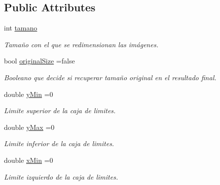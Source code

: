 \subsection*{Public Attributes}
\begin{DoxyCompactItemize}
\item 
\mbox{\label{classuav_1_1Stitcher_aecfe8592eb3d8445c0f3e8b722558acb}} 
int \mbox{\hyperlink{classuav_1_1Stitcher_aecfe8592eb3d8445c0f3e8b722558acb}{tamano}}
\begin{DoxyCompactList}\small\item\em Tamaño con el que se redimensionan las imágenes. \end{DoxyCompactList}\item 
\mbox{\label{classuav_1_1Stitcher_a222f8247abb4fafba61d86078d8f9c16}} 
bool \mbox{\hyperlink{classuav_1_1Stitcher_a222f8247abb4fafba61d86078d8f9c16}{original\+Size}} =false
\begin{DoxyCompactList}\small\item\em Booleano que decide si recuperar tamaño original en el resultado final. \end{DoxyCompactList}\item 
\mbox{\label{classuav_1_1Stitcher_a4b793c80fbb1052781b3787e90d19f97}} 
double \mbox{\hyperlink{classuav_1_1Stitcher_a4b793c80fbb1052781b3787e90d19f97}{y\+Min}} =0
\begin{DoxyCompactList}\small\item\em Limite superior de la caja de limites. \end{DoxyCompactList}\item 
\mbox{\label{classuav_1_1Stitcher_ae5ef4cb4ade964a9ff73c8228db26f6a}} 
double \mbox{\hyperlink{classuav_1_1Stitcher_ae5ef4cb4ade964a9ff73c8228db26f6a}{y\+Max}} =0
\begin{DoxyCompactList}\small\item\em Limite inferior de la caja de limites. \end{DoxyCompactList}\item 
\mbox{\label{classuav_1_1Stitcher_a26ca9f2ae4842f0d380f95d792c0c7ba}} 
double \mbox{\hyperlink{classuav_1_1Stitcher_a26ca9f2ae4842f0d380f95d792c0c7ba}{x\+Min}} =0
\begin{DoxyCompactList}\small\item\em Limite izquierdo de la caja de limites. \end{DoxyCompactList}\item 

\end{DoxyCompactItemize}
